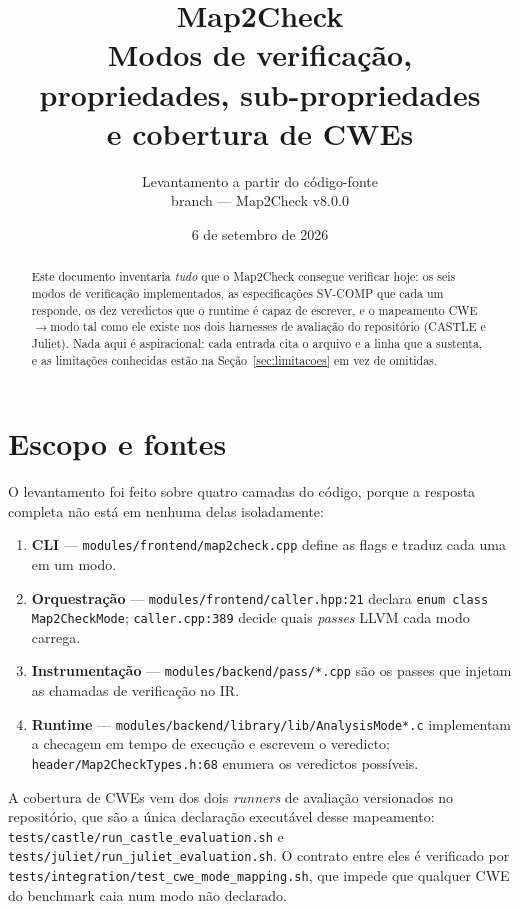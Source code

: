 \documentclass[11pt,a4paper]{article}
\title{\textbf{Map2Check}\\[2mm]
\large Modos de verificação, propriedades, sub-propriedades\\ e cobertura de CWEs}
\author{Levantamento a partir do código-fonte\\
\small branch \code{wasm-verification-upgrade} --- Map2Check v8.0.0}
\date{6 de setembro de 2026}
\newcommand{\code}[1]{\texttt{#1}}
\newcommand{\src}[1]{{\small\texttt{#1}}}
\begin{document}
\maketitle

\begin{abstract}
\noindent
Este documento inventaria \emph{tudo} que o Map2Check consegue verificar hoje:
os seis modos de verificação implementados, as especificações SV-COMP que cada
um responde, os dez veredictos que o runtime é capaz de escrever, e o
mapeamento CWE${\rightarrow}$modo tal como ele existe nos dois harnesses de
avaliação do repositório (CASTLE e Juliet). Nada aqui é aspiracional: cada
entrada cita o arquivo e a linha que a sustenta, e as limitações conhecidas
estão na Seção~\ref{sec:limitacoes} em vez de omitidas.
\end{abstract}

\tableofcontents
\bigskip

\section{Escopo e fontes}

O levantamento foi feito sobre quatro camadas do código, porque a resposta
completa não está em nenhuma delas isoladamente:

\begin{enumerate}[leftmargin=*,itemsep=2pt]
  \item \textbf{CLI} --- \src{modules/frontend/map2check.cpp} define as flags e
        traduz cada uma em um modo.
  \item \textbf{Orquestração} --- \src{modules/frontend/caller.hpp:21} declara
        \code{enum class Map2CheckMode}; \src{caller.cpp:389} decide quais
        \emph{passes} LLVM cada modo carrega.
  \item \textbf{Instrumentação} --- \src{modules/backend/pass/*.cpp} são os
        passes que injetam as chamadas de verificação no IR.
  \item \textbf{Runtime} --- \src{modules/backend/library/lib/AnalysisMode*.c}
        implementam a checagem em tempo de execução e escrevem o veredicto;
        \src{header/Map2CheckTypes.h:68} enumera os veredictos possíveis.
\end{enumerate}

A cobertura de CWEs vem dos dois \emph{runners} de avaliação versionados no
repositório, que são a única declaração executável desse mapeamento:
\src{tests/castle/run\_castle\_evaluation.sh} e
\src{tests/juliet/run\_juliet\_evaluation.sh}. O contrato entre eles é
verificado por \src{tests/integration/test\_cwe\_mode\_mapping.sh}, que impede
que qualquer CWE do benchmark caia num modo não declarado.
\end{document}
